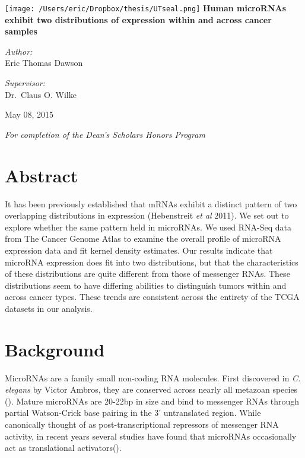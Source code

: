 \documentclass[12pt]{report}
\begin{document}
\begin{titlepage}
\begin{center}
 \texttt{[image: /Users/eric/Dropbox/thesis/UTseal.png]}
 \vfill
 \Huge \textbf{Human microRNAs exhibit two distributions of expression within and across cancer samples}
 \vfill
\noindent
\begin{minipage}[t]{0.4\textwidth}
\begin{flushleft} \large
\emph{Author:}\\
Eric Thomas Dawson
\end{flushleft}
\end{minipage}%
\begin{minipage}[t]{0.4\textwidth}
\begin{flushright} \large
\emph{Supervisor:} \\
Dr.~Claus O. Wilke
\end{flushright}
\end{minipage}
\vfill
\large May 08, 2015

\large \textit{For completion of the Dean's Scholars Honors Program}
\end{center}
\vfill

\vfill

\end{titlepage}





\section*{Abstract}
It has been previously established that mRNAs exhibit a distinct pattern of two overlapping distributions in expression (Hebenstreit \textit{et al} 2011).
We set out to explore whether the same pattern held in microRNAs.
We used RNA-Seq data from The Cancer Genome Atlas to examine the overall profile of microRNA expression data and fit kernel density estimates.
Our results indicate that microRNA expression does fit into two
distributions, but that the characteristics of these distributions are quite different from those of messenger RNAs. These distributions  seem to have differing abilities
to distinguish tumors within and across cancer types. These trends are consistent across the entirety of the TCGA datasets in our analysis.

\section*{Background}
MicroRNAs are a family small non-coding RNA molecules. First discovered in \emph{C. elegans} 
by Victor Ambros, they are conserved across nearly all metazoan species ().
Mature microRNAs are 20-22bp in size and bind to messenger RNAs through partial 
Watson-Crick base pairing in the 3' untranslated region. While canonically thought of as post-transcriptional 
repressors of messenger RNA activity, in recent years several studies have found 
that microRNAs occasionally act as translational activators().
\end{document}
